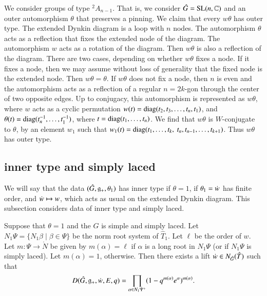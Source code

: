 We consider groups of type ${}^2A_{n-1}$.  That is, we consider $\hat
G = {\operatorname{SL}}(n,\mathbb{C})$ and an outer automorphism $\theta$ that
preserves a pinning.  We claim that every $w\theta$ has outer type.
The extended Dynkin diagram is a loop with $n$ nodes.  The
automorphism $\theta$ acts as a reflection that fixes the extended
node of the diagram.  The automorphism $w$ acts as a rotation of the
diagram.  Then $w \theta$ is also a reflection of the diagram.  There
are two cases, depending on whether $w\theta$ fixes a node.  If it
fixes a node, then we may assume without loss of generality that the
fixed node is the extended node.  Then $w\theta = \theta$.  If
$w\theta$ does not fix a node, then $n$ is even and the automorphism
acts as a reflection of a regular $n=2k$-gon through the center of two
opposite edges.  Up to conjugacy, this automorphism is represented as
$w\theta$, where $w $ acts as a cyclic permutation $w (t) =
{\operatorname{diag}}(t_2,t_3,\ldots,t_n,t_1)$, and $\theta(t) =
{\operatorname{diag}}(t_n^{-1},\ldots,t_1^{-1})$, where
$t={\operatorname{diag}}(t_1,\ldots,t_n)$.  We find that $w \theta$ is
$W$-conjugate to $\theta$, by an element $w_1$ such that $w_1(t) =
{\operatorname{diag}}(t_1,\ldots,t_k,\ t_n,t_{n-1},\ldots,t_{k+1})$. Thus
$w\theta$ has outer type.


\subsection{inner type and simply laced}  
We will say that the data $(\hat G,{\mathfrak g}_+,\theta_1)$ has inner type if
$\theta=1$, if $\theta_1 = \dot w$ has finite order, and $\dot w\mapsto
w$, which acts as usual on the extended Dynkin diagram.  This
subsection considers data of inner type and simply laced.

\begin{lemma}\label{lemma:inner} 
  Suppose that $\theta=1$ and the $\hat G$ is simple and simply laced.
  Let $N_1\Psi=\{N_1\beta\mid \beta\in \Psi\}$ be the norm root system
  of $\hat T_1$. Let $\ell$ be the order of $w$.  Let $m:\Psi\to
  \ring{N}$ be given by $m(\alpha)=\ell$ if $\alpha$ is a long root in
  $N_1\Psi$ (or if $N_1\Psi$ is simply laced).  Let $m(\alpha) = 1$,
  otherwise.  Then there exists a lift $\dot w\in N_{\hat G}(\hat T)$
  such that
\[
D(\hat G,{\mathfrak g}_+,\dot w,E,q) 
= \prod_{\alpha\in N_1\Psi^+} (1- q^{m(\alpha)} e^\alpha)^{m(\alpha)}.
\]
\end{lemma}

